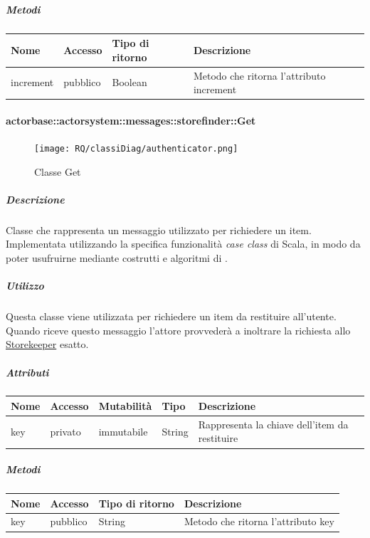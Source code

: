 \documentclass{scalatekids-article}
\begin{document}
\subparagraph{Metodi}
\begin{tabular}{| l | l | l | l |}
  \hline
  Nome & Accesso & Tipo di ritorno & Descrizione\\
  \hline
  increment & pubblico & Boolean & Metodo che ritorna l'attributo increment\\
  \hline
\end{tabular}

\paragraph{actorbase::actorsystem::messages::storefinder::Get}
\label{sec:actorbase::actorsystem::messages::storefinder::Get}

\begin{figure}[H]
  \begin{center}
    \texttt{[image: RQ/classiDiag/authenticator.png]}
    \caption{Classe Get}
  \end{center}
\end{figure}

\subparagraph{Descrizione}
Classe che rappresenta un messaggio utilizzato per richiedere un item.\\Implementata utilizzando la specifica funzionalità \textit{case class} di Scala,
in modo da poter usufruirne mediante costrutti e algoritmi di
.

\subparagraph{Utilizzo}
Questa classe viene utilizzata per richiedere un item da restituire
all'utente.\\Quando riceve questo messaggio l'attore provvederà a inoltrare la
richiesta allo \hyperref[sec:actorbase::actorsystem::actors::storekeeper::Storekeeper]{Storekeeper} esatto.

\subparagraph{Attributi}
\begin{tabular}{| p{2cm} | p{1.5cm} | p{2cm} | p{3cm} | p{8.5cm} |}
  \hline
  Nome & Accesso & Mutabilità & Tipo & Descrizione\\
  \hline
  key & privato & immutabile & String & Rappresenta la chiave dell'item da restituire\\
  \hline
\end{tabular}

\subparagraph{Metodi}
\begin{tabular}{| l | l | l | l |}
  \hline
  Nome & Accesso & Tipo di ritorno & Descrizione\\
  \hline
  key & pubblico & String & Metodo che ritorna l'attributo key\\
  \hline
\end{tabular}
\end{document}
